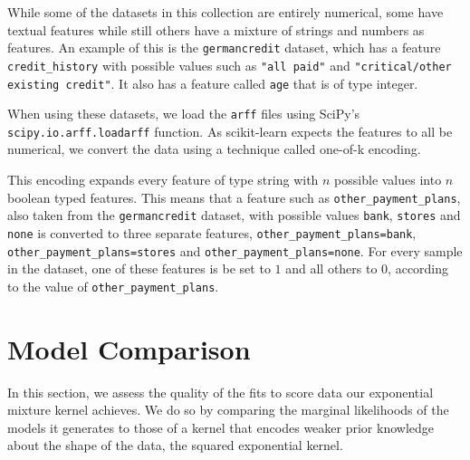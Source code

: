 \documentclass[a4paper,12pt,twoside,openright]{report}
\begin{document}
While some of the datasets in this collection are entirely numerical, some have textual features while still others have a mixture of strings and numbers as features. An example of this is the \texttt{germancredit} dataset, which has a feature \texttt{credit\_history} with possible values such as \texttt{"all paid"} and \texttt{"critical/other existing credit"}. It also has a feature called \texttt{age} that is of type integer.

When using these datasets, we load the \texttt{arff} files using SciPy's \texttt{scipy.io.arff.loadarff} function. As scikit-learn expects the features to all be numerical, we convert the data using a technique called one-of-k encoding.


This encoding expands every feature of type string with $n$ possible values into $n$ boolean typed features. This means that a feature such as \texttt{other\_payment\_plans}, also taken from the \texttt{germancredit} dataset, with possible values \texttt{bank}, \texttt{stores} and \texttt{none} is converted to three separate features, \texttt{other\_payment\_plans=bank}, \texttt{other\_payment\_plans=stores} and \texttt{other\_payment\_plans=none}. For every sample in the dataset, one of these features is be set to $1$ and all others to $0$, according to the value of \texttt{other\_payment\_plans}.



\section{Model Comparison}
In this section, we assess the quality of the fits to score data our exponential mixture kernel achieves. We do so by comparing the marginal likelihoods of the models it generates to those of a kernel that encodes weaker prior knowledge about the shape of the data, the squared exponential kernel.


\end{document}
